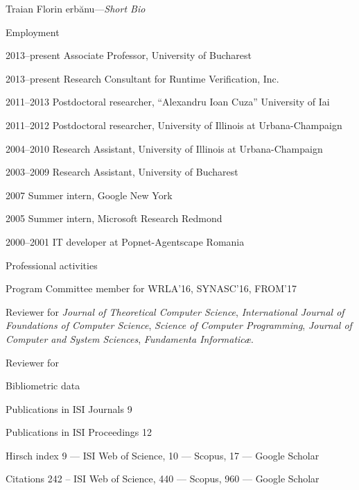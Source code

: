 \documentclass[10pt]{article}
\newcommand{\sh}{\unichar{0537}}
\newcommand{\Sh}{\unichar{0536}}
\newcommand{\tz}{\unichar{0539}}
\newcommand{\Serbanuta}{{\Sh}er\-b{\u a}\-nu\-{\tz}{\u a}}
\newenvironment{subbulletlist}{%
    \begin{list}{\labelitemii}{%
        \setlength{\topsep}{\itemsep}\setlength{\parskip}{\parsep}%
    }%
}%
{ \end{list} }
\begin{document}
\begin{cv}{Traian Florin \Serbanuta{}---{\large \itshape Short Bio}}
\begin{cvlist}{Employment}
	\item[2013--present] Associate Professor, University of Bucharest
	\item[2013--present] Research Consultant for Runtime Verification, Inc.
    \item[2011--2013] Postdoctoral researcher,
     ``Alexandru Ioan Cuza'' University of Ia{\sh}i
    \item[2011--2012] Postdoctoral researcher,
    University of Illinois at 
    Urbana-Champaign
    \item[2004--2010] Research Assistant,
    University of Illinois at 
    Urbana-Champaign
    \item[2003--2009] Research Assistant, University of Bucharest
     \item[2007] Summer intern,
     Google New York
     \item[2005] Summer intern, Microsoft Research Redmond
     \item[2000--2001] IT developer at Popnet-Agentscape Romania
\end{cvlist}

\begin{cvlist}{Professional activities}
        \item[Program Committee member for] WRLA'16, SYNASC'16, FROM'17
        \item[Reviewer for] \textit{Journal of Theoretical Computer Science}, \textit{International Journal of Foundations of Computer Science}, \textit{Science of Computer Programming}, \textit{Journal of Computer and System Sciences}, \textit{Fundamenta Informatic\ae}.
        \item[Reviewer for]  
\end{cvlist}

%
\newpage
  \begin{cvlist}{Bibliometric data}
  \item[Publications in ISI Journals] 9
  \item[Publications in ISI Proceedings] 12
  \item[Hirsch index] 9 --- ISI Web of Science, 10 --- Scopus, 17 --- Google Scholar
  \item[Citations] 242 -- ISI Web of Science, 440 --- Scopus, 960 --- Google Scholar
  \end{cvlist}



\end{cv}
\end{document}
